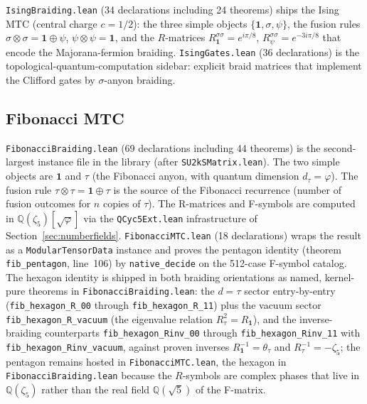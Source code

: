 \documentclass[11pt]{article}
\begin{document}
\texttt{IsingBraiding.lean} (34 declarations including 24 theorems)
ships the Ising MTC (central charge $c = 1/2$): the three simple
objects $\{\mathbf{1}, \sigma, \psi\}$, the fusion rules
$\sigma \otimes \sigma = \mathbf{1} \oplus \psi$,
$\psi \otimes \psi = \mathbf{1}$, and the $R$-matrices
$R^{\sigma \sigma}_{\mathbf{1}} = e^{i\pi/8}$,
$R^{\sigma \sigma}_\psi = e^{-3i\pi/8}$ that encode the
Majorana-fermion braiding. \texttt{IsingGates.lean} (36
declarations) is the topological-quantum-computation sidebar:
explicit braid matrices that implement the Clifford gates by
$\sigma$-anyon braiding.

\subsection{Fibonacci MTC}

\texttt{FibonacciBraiding.lean} (69 declarations including 44
theorems) is the second-largest instance file in the library
(after \texttt{SU2kSMatrix.lean}). The
two simple objects are $\mathbf{1}$ and $\tau$ (the Fibonacci
anyon, with quantum dimension $d_\tau = \varphi$). The fusion rule
$\tau \otimes \tau = \mathbf{1} \oplus \tau$ is the source of the
Fibonacci recurrence (number of fusion outcomes for $n$ copies of
$\tau$). The R-matrices and F-symbols are computed in
$\mathbb{Q}(\zeta_5)[\sqrt{\varphi}]$ via the
\texttt{QCyc5Ext.lean} infrastructure of
Section~\ref{sec:numberfields}. \texttt{FibonacciMTC.lean}
(18 declarations) wraps the result as a \texttt{ModularTensorData}
instance and proves the pentagon identity (theorem
\texttt{fib\_pentagon}, line~106) by \texttt{native\_decide} on the
512-case F-symbol catalog. The hexagon identity is shipped in both
braiding orientations as named, kernel-pure theorems in
\texttt{FibonacciBraiding.lean}: the $d = \tau$ sector
entry-by-entry (\texttt{fib\_hexagon\_R\_00} through
\texttt{fib\_hexagon\_R\_11}) plus the vacuum sector
\texttt{fib\_hexagon\_R\_vacuum} (the eigenvalue relation
$R_\tau^2 = R_{\mathbf{1}}$), and the inverse-braiding counterparts
\texttt{fib\_hexagon\_Rinv\_00} through
\texttt{fib\_hexagon\_Rinv\_11} with
\texttt{fib\_hexagon\_Rinv\_vacuum}, against proven inverses
$R_{\mathbf{1}}^{-1} = \theta_\tau$ and $R_\tau^{-1} = -\zeta_5$;
the pentagon remains hosted in \texttt{FibonacciMTC.lean}, the
hexagon in \texttt{FibonacciBraiding.lean} because the $R$-symbols
are complex phases that live in $\mathbb{Q}(\zeta_5)$ rather than
the real field $\mathbb{Q}(\sqrt{5})$ of the F-matrix.

\end{document}
